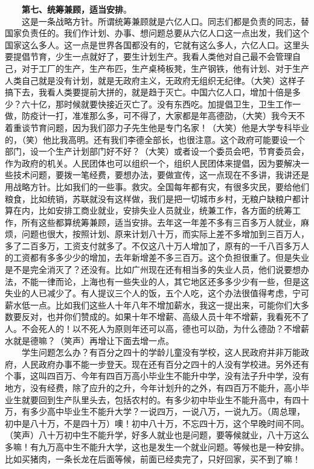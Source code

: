 \documentclass[cn,11pt,chinese]{elegantbook}
\begin{document}
　　\textbf{第七、统筹兼顾，适当安排}。\\
　　这是一条战略方针。所谓统筹兼顾就是六亿人口。同志们都是负责的同志，替国家负责任的。我们作计划、办事、想问题总要从六亿人口这一点出发，我们这个国家这么多人。这一点是世界各国都没有的，它就有这么多人，六亿人口。这里头要提倡节育，少生一点就好了，要生计划生产。我看人类他对自己最不会管理自己，对于工厂的生产，生产布匹，生产桌椅板凳，生产钢铁，他有计划、对于生产人类自己就是没有计划，就是无政府主义，无政府无组织无纪律。（大笑）这样子搞下去，我看人类要提前大拼的，就是趋于灭亡。中国六亿人口，增加十倍是多少？六十亿，那时候就要快接近灭亡了。没有东西吃。加提倡卫生，卫生工作一做，防疫计一打，准准那么多，可不得了，大家都是年高德劭，（大笑）我今天不着重谈节育问题，因为我们邵力子先生他是专门名家！（大笑）他是大学专科毕业的，（笑）他比我高明。还有我们李德全部长，也很注意。这个政府可能要设一个部门，设一个生产计划部门好不好？（大笑）或者设一个委员会吧，节育委员会，作为政府的机关。人民团体也可以组织一个，组织人民团体来提倡，因为要解决一些技术问题，要拨一笔经费，要想办法，要做宣传，这一点现在不多讲，我讲还是用战略方针。比如我们的一些事。救灾。全国每年都有灾，有很多灾民，要给他们粮食，比如统销，苏联就没有这样做，我们是把一切城市乡村，无粮户缺粮户都计算在内，比如安排工商业就业，安排失业人员就业，统兼工作，各方面的统筹工作，所有这些都算统筹兼顾，适当安排。去年这一年差不多有三百多万人就业，麻烦，问题也很大，按照计划、原来计划八十万，而实际上差不多增加到三百万人，多了二百多万，工资支付就多了。不仅这八十万人增加了，原有的一千八百多万人的工资都有多多少少的增加，去年新增差不多三百万。这个负担很重了。但是失业是不是完全消灭了？还没有。比如广州现在还有相当多的失业人员，他们说要想办法，不能一律而论，上海也有一些失业的人，其它地区还多多少少有一些，但是这失业的人已减少了。有人提议三个人的饭，五个人吃，这个办法很值得考虑，宁可薪水低一点。比如我们这些人十年八年不增加薪水，我这一提出来，可能你们大多数要反对，也并你们赞成的。如果十年不增薪、高级人员十年不增薪，我看死不了人。不会死人的！以不死人为原则年还可以高，德也可以劭，为什么德劭？不增薪水就是德嘛？（笑声）再增让下面去增一点。\\
　　学生问题怎么办？有百分之四十的学龄儿童没有学校，这人民政府并非万能政府，人民政府办事不能一步登天。现在还有百分之四十的人没有学校进。另外还有个事，这叫四百万、今年有四百万高小毕业生不能升中学，没有法子升中学，没有地方，没有经费，除了应升的之升，今年计划升的之外，有四百万不能升，高小毕业生就要回到生产队里头去，包括农村的。有多少初中毕业生不能升高中，有四十万，有多少高中毕业生不能升大学？一说四万，一说八万，一说九万。（周总理，初中是八十万，不是四十万）噢！初中八十万，不忘四十万，这个早晚时间不同。（笑声）八十万初中生不能升学，好多人就业也是问题，要等候就业，八十万这么多嘛！有九万高中生不能升大学，这也是发生一个就业问题。等候也是一种安排。比如买猪肉，一条长龙在后面等候，前面已经卖完了，只好回家，买不到了嘛！\\
\end{document}
